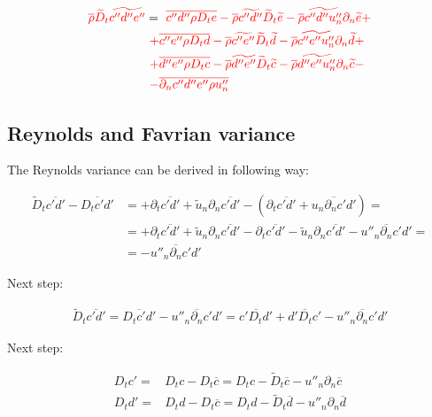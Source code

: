 \documentclass[10pt,paper=a4]{report}
\newcommand{\eht}{\overline}
\newcommand{\fht}{\widetilde}
\begin{document}
\begin{align}
{\color{red} \eht{\rho}\fht{D}_t \fht{c''d''e''}} & = {\color{red} \ \eht{c''d''\rho D_t e} - \eht{\rho}\fht{c''d''}\fht{D}_t \fht{e} - \eht{\rho}\fht{c''d''u''_n} \partial_n \fht{e} +} \\
& {\color{red}\ + \eht{c''e''\rho D_t d} - \eht{\rho}\fht{c''e''}\fht{D}_t \fht{d} - \eht{\rho}\fht{c''e''u''_n} \partial_n \fht{d} +} \\
& {\color{red} \ + \eht{d''e''\rho D_t c} - \eht{\rho}\fht{d''e''}\fht{D}_t \fht{c} - \eht{\rho}\fht{d''e''u''_n} \partial_n \fht{c} -} \\
& {\color{red} \ - \eht{\partial_n c''d''e'' \rho u''_n}}    
\end{align}

\fontsize{12pt}{20pt}

\subsection{Reynolds and Favrian variance}
\label{sect:reynolds-favrian-variance}

The Reynolds variance can be derived in following way:

\fontsize{11pt}{20pt}

\begin{align}
\fht{D}_t \eht{c'd'} - \eht{D_t c'd'} & = +\partial_t \eht{c'd'} + \fht{u}_n \partial_n \eht{c'd'} - (\partial_t \eht{c'd'} + \eht{u_n \partial_n c'd'}) = \\
& = +\partial_t \eht{c'd'} + \fht{u}_n \partial_n \eht{c'd'} - \partial_t \eht{c'd'} - \fht{u}_n \partial_n \eht{c'd'} - \eht{u''_n \partial_n c'd'} = \\
& = - \eht{u''_n \partial_n c'd'}
\end{align}

Next step:

\begin{align}
\fht{D}_t \eht{c'd'} = \eht{D_t c'd'} - \eht{u''_n \partial_n c'd'} = \eht{c' D_t d'} + \eht{d' D_t c'} - \eht{u''_n \partial_n c'd'}
\label{eq:reynolds-variance-general}
\end{align}

Next step:

\begin{align}
D_t c' = & D_t c - D_t \eht{c} = D_t c - \fht{D}_t \eht{c} - u''_n \partial_n \eht{c} \\
D_t d' = & D_t d - D_t \eht{c} = D_t d - \fht{D}_t \eht{d} - u''_n \partial_n \eht{d}
\end{align}
\end{document}
